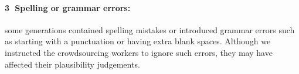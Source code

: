 \noindent \paragraph{\textcircled{3} Spelling or grammar errors:} some generations contained spelling mistakes or introduced grammar errors such as starting with a punctuation or having extra blank spaces. Although we instructed the crowdsourcing workers to ignore such errors, they may have affected their plausibility judgements.
